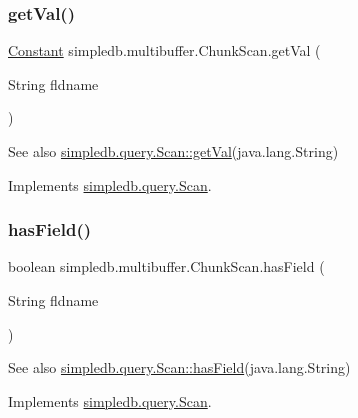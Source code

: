 \subsubsection{\texorpdfstring{get\+Val()}{getVal()}}
{\footnotesize\ttfamily \hyperlink{classsimpledb_1_1query_1_1Constant}{Constant} simpledb.\+multibuffer.\+Chunk\+Scan.\+get\+Val (\begin{DoxyParamCaption}\item[{String}]{fldname }\end{DoxyParamCaption})\hspace{0.3cm}{\ttfamily [inline]}}

\begin{DoxySeeAlso}{See also}
\hyperlink{interfacesimpledb_1_1query_1_1Scan_aca80bca2857c983a88834bf6c01ee5ca}{simpledb.\+query.\+Scan\+::get\+Val}(java.\+lang.\+String) 
\end{DoxySeeAlso}


Implements \hyperlink{interfacesimpledb_1_1query_1_1Scan_aca80bca2857c983a88834bf6c01ee5ca}{simpledb.\+query.\+Scan}.

\mbox{\label{classsimpledb_1_1multibuffer_1_1ChunkScan_ab63331aac633c7b12a5aa0401a77d2b2}} 
\subsubsection{\texorpdfstring{has\+Field()}{hasField()}}
{\footnotesize\ttfamily boolean simpledb.\+multibuffer.\+Chunk\+Scan.\+has\+Field (\begin{DoxyParamCaption}\item[{String}]{fldname }\end{DoxyParamCaption})\hspace{0.3cm}{\ttfamily [inline]}}

\begin{DoxySeeAlso}{See also}
\hyperlink{interfacesimpledb_1_1query_1_1Scan_a8f4ccf13eed0bed983c928e9b998fe5c}{simpledb.\+query.\+Scan\+::has\+Field}(java.\+lang.\+String) 
\end{DoxySeeAlso}


Implements \hyperlink{interfacesimpledb_1_1query_1_1Scan_a8f4ccf13eed0bed983c928e9b998fe5c}{simpledb.\+query.\+Scan}.

